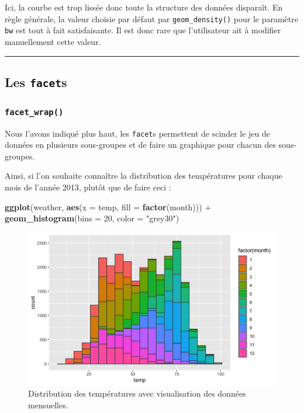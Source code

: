 \documentclass[a4paperpaper,]{article}
\newenvironment{Shaded}{\begin{snugshade}}{\end{snugshade}}
\newcommand{\DataTypeTok}[1]{\textcolor[rgb]{0.00,0.34,0.68}{#1}}
\newcommand{\DecValTok}[1]{\textcolor[rgb]{0.69,0.50,0.00}{#1}}
\newcommand{\KeywordTok}[1]{\textcolor[rgb]{0.12,0.11,0.11}{\textbf{#1}}}
\newcommand{\NormalTok}[1]{\textcolor[rgb]{0.12,0.11,0.11}{#1}}
\newcommand{\OperatorTok}[1]{\textcolor[rgb]{0.12,0.11,0.11}{#1}}
\newcommand{\StringTok}[1]{\textcolor[rgb]{0.75,0.01,0.01}{#1}}
\begin{document}
Ici, la courbe est trop lissée donc toute la structure des données disparaît. En règle générale, la valeur choisie par défaut par \texttt{geom\_density()} pour le paramètre \texttt{bw} est tout à fait satisfaisante. Il est donc rare que l'utilisateur ait à modifier manuellement cette valeur.

\begin{center}\rule{0.5\linewidth}{\linethickness}\end{center}

\hypertarget{facets}{%
\subsection{\texorpdfstring{Les \texttt{facet}s}{Les facets}}\label{facets}}

\hypertarget{facet_wrap}{%
\subsubsection{\texorpdfstring{\texttt{facet\_wrap()}}{facet\_wrap()}}\label{facet_wrap}}

Nous l'avons indiqué plus haut, les \texttt{facet}s permettent de scinder le jeu de données en plusieurs sous-groupes et de faire un graphique pour chacun des sous-groupes.

Ainsi, si l'on souhaite connaître la distribution des températures pour chaque mois de l'année 2013, plutôt que de faire ceci :

\begin{Shaded}
\begin{Highlighting}[]
\KeywordTok{ggplot}\NormalTok{(weather, }\KeywordTok{aes}\NormalTok{(}\DataTypeTok{x =}\NormalTok{ temp, }\DataTypeTok{fill =} \KeywordTok{factor}\NormalTok{(month))) }\OperatorTok{+}
\StringTok{  }\KeywordTok{geom_histogram}\NormalTok{(}\DataTypeTok{bins =} \DecValTok{20}\NormalTok{, }\DataTypeTok{color =} \StringTok{"grey30"}\NormalTok{)}
\end{Highlighting}
\end{Shaded}

\begin{figure}[htpb]

{\centering \includegraphics[width=0.9\linewidth]{figure/unnamed-chunk-52-1} 

}

\caption{Distribution des températures avec visualisation des données mensuelles.}\label{fig:unnamed-chunk-52}
\end{figure}
\end{document}
